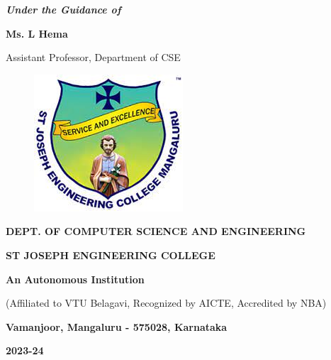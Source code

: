 \documentclass[12pt,a4paper]{report}
\begin{document}
\begin{center}
\vspace{12pt}
\textit{\textbf{Under the Guidance of}}
\par
\vspace{6pt}
\textbf{Ms. L Hema}
\par
\vspace{2pt}
\normalsize {Assistant Professor, Department of CSE}
\par
\begin{figure}[hbtp]
\centering
\includegraphics[scale=0.6]{./pic/sjeclogo.png}
\end{figure}
\large \textbf{DEPT. OF COMPUTER SCIENCE AND ENGINEERING}
\par \Large \textbf{ST JOSEPH ENGINEERING COLLEGE}
\par 
\textbf{An Autonomous Institution}
\par
{\large{(Affiliated to VTU Belagavi, Recognized by AICTE, Accredited by NBA)}}
\par
{\large \textbf{Vamanjoor, Mangaluru - 575028, Karnataka}}
\par 
{\Large \textbf{2023-24}}
\end{center}
\newpage
\end{document}

